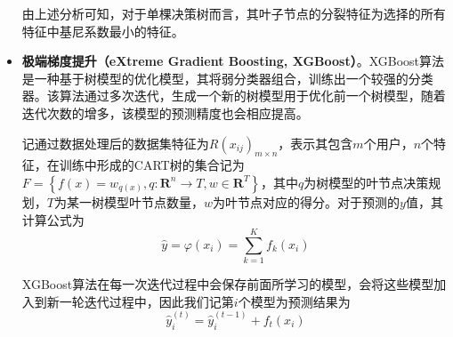\documentclass{MathorCupmodeling}
\begin{document}
\begin{itemize}
		由上述分析可知，对于单棵决策树而言，其叶子节点的分裂特征为选择的所有特征中基尼系数最小的特征。
		\item \textbf{极端梯度提升（eXtreme Gradient Boosting, XGBoost）}。XGBoost算法是一种基于树模型的优化模型，其将弱分类器组合，训练出一个较强的分类器。该算法通过多次迭代，生成一个新的树模型用于优化前一个树模型，随着迭代次数的增多，该模型的预测精度也会相应提高\textcolor{blue}{\cite{pxgboost1}}。

		记通过数据处理后的数据集特征为$R\left(x_{ij}\right)_{m\times n}$，表示其包含$m$个用户，$n$个特征，在训练中形成的CART树的集合记为$F=\left\{f\left(x\right)=w_{q\left(x\right)},q:\mathbf{R}^n\to T,w\in \mathbf{R}^T\right\}$，其中$q$为树模型的叶节点决策规划，$T$为某一树模型叶节点数量，$w$为叶节点对应的得分\textcolor{blue}{\cite{pxgboost2}}。对于预测的$y$值，其计算公式为
		\begin{equation}
			\hat{y}=\varphi \left( x_i \right) =\sum\limits_{k=1}^K{f_k\left( x_i \right)} \label{fXGBoostypre}
		\end{equation}
	
		XGBoost算法在每一次迭代过程中会保存前面所学习的模型，会将这些模型加入到新一轮迭代过程中，因此我们记第$i$个模型为预测结果为
		\begin{equation}
			\hat{y}_{i}^{\left(t\right)}=\hat{y}_{i}^{\left(t-1\right)}+f_t\left(x_i\right) \label{fXGBoostyprei}
		\end{equation}
		

\end{itemize}
\end{document}
